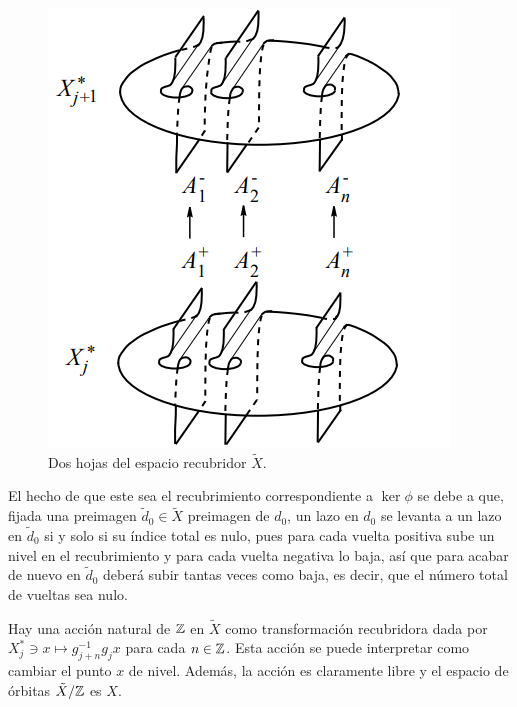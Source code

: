 \documentclass[TFG.tex]{subfiles}
\begin{document}

\begin{figure}[h!]
\includegraphics[scale=0.6]{Imagenes/recubrimiento}
\caption{Dos hojas del espacio recubridor $\tilde{X}$.}\label{recubrimiento}
\end{figure}

El hecho de que este sea el recubrimiento correspondiente a $\ker\phi$ se debe a que, fijada una preimagen $\tilde{d}_0\in\tilde{X}$ preimagen de $d_0$, un lazo en $d_0$ se levanta a un lazo en $\tilde{d}_0$ si y solo si su índice total es nulo, pues para cada vuelta positiva sube un nivel en el recubrimiento y para cada vuelta negativa lo baja, así que para acabar de nuevo en $\tilde{d}_0$ deberá subir tantas veces como baja, es decir, que el número total de vueltas sea nulo.

Hay una acción natural de $\mathbb{Z}$ en $\tilde{X}$ como transformación recubridora dada por $X^*_j\ni x\mapsto g_{j+n}^{-1}g_jx$ para cada $n\in\mathbb{Z}$. Esta acción se puede interpretar como cambiar el punto $x$ de nivel. Además, la acción es claramente libre y el espacio de órbitas $\tilde{X}/\mathbb{Z}$ es $X$.%



\end{document}

